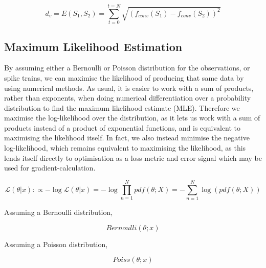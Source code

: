 \documentclass[mphil,deptreport,ai]{infthesis} %
\begin{document}

\begin{equation}
    d_v = E(S_1, S_2) = \sum_{t=0}^{t=N} \sqrt{(f_{conv}(S_1)-f_{conv}(S_2))^2}
\end{equation}




\subsection{Maximum Likelihood Estimation}

By assuming either a Bernoulli or Poisson distribution for the observations, or spike trains, we can maximise the likelihood of producing that same data by using numerical methods.
As usual, it is easier to work with a sum of products, rather than exponents, when doing numerical differentiation over a probability distribution to find the maximum likelihood estimate (MLE).
Therefore we maximise the log-likelihood over the distribution, as it lets us work with a sum of products instead of a product of exponential functions, and is equivalent to maximising the likelihood itself.
In fact, we also instead minimise the negative log-likelihood, which remains equivalent to maximising the likelihood, as this lends itself directly to optimisation as a loss metric and error signal which may be used for gradient-calculation.

\begin{equation}
    \mathcal{L}(\theta | x) :\propto - \log \mathcal{L}(\theta | x) = - \log \prod_{n=1}^N pdf(\theta; X) = - \sum_{n=1}^N \log (pdf(\theta; X))
\end{equation}

Assuming a Bernoulli distribution,

\begin{equation}
    Bernoulli(\theta; x)
\end{equation}

Assuming a Poisson distribution,

\begin{equation}
    Poiss(\theta; x)
\end{equation}
\end{document}
